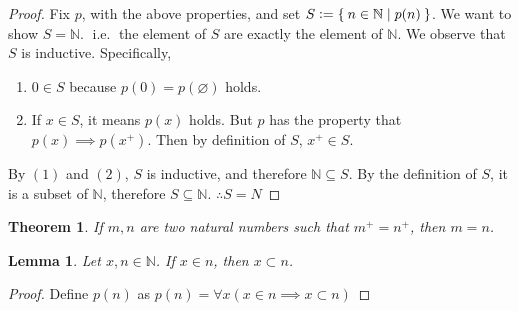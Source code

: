 \documentclass[12pt]{amsart}
\newcommand{\bbN}{\mathbb{N}}
\newcommand{\ie}{\operatorname{i.e.}}
\theoremstyle{plain}
\newtheorem*{thm}{Theorem}
\newtheorem*{lem}{Lemma}
\theoremstyle{remark}
\theoremstyle{definition}
\begin{document}
\begin{proof}
	Fix $p$, with the above properties, and set $S \vcentcolon = \Set{n \in \bbN | p(n)}$. We want to show $S = \bbN$. $\ie$ the element of $S$ are exactly the element of $\bbN$.
	\newline
	We observe that $S$ is inductive. Specifically,
	\begin{enumerate}[(1)]
		\item $0 \in S$ because $p(0) = p(\varnothing)$ holds.
		\item If $x \in S$, it means $p(x)$ holds. But $p$ has the property that $p(x) \implies p(x^+)$. Then by definition of $S$, $x^+ \in S$.
	\end{enumerate}
	By $(1)$ and $(2)$, $S$ is inductive, and therefore $\bbN \subseteq S$.
	By the definition of $S$, it is a subset of $\bbN$, therefore $S \subseteq \bbN$.
	\newline
	$\therefore S = N$ 
\end{proof}

\begin{thm}
	If $m, n$ are two natural numbers such that $m^+ = n^+$, then $m = n$.
\end{thm}

\begin{lem}
	Let $x, n \in \bbN$. If $x \in n$, then $x \subset n$.
\end{lem}
\begin{proof}
	Define $p(n)$ as $p(n) = \forall x(x\in n \implies x \subset n)$
\end{proof}
\end{document}
